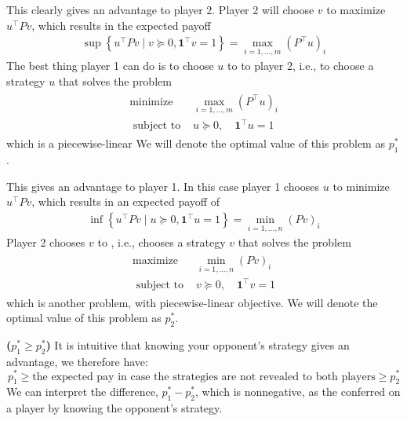 \documentclass{article}
\newcommand{\bfs}[1]{\textbf{({#1}) }}
\begin{document}

This clearly gives an advantage to player 2. Player 2 will choose $v$ to maximize $u^{\top} P v$, which results in the expected payoff
\begin{align*}
\sup \left\{u^{\top} P v \mid v \succeq 0, \mathbf{1}^{\top} v=1\right\}=\max _{i=1, \ldots, m}\left(P^{\top} u\right)_{i}
\end{align*}
The best thing player 1 can do is to choose $u$ to  to player 2, i.e., to choose a strategy $u$ that solves the problem
\begin{align}
\begin{array}{ll}
\operatorname{minimize} & \max _{i=1, \ldots, m}\left(P^{\top} u\right)_{i} \\
\text { subject to } & u \succeq 0, \quad \mathbf{1}^{\top} u=1
\end{array}\label{eq:fhegh}
\end{align}
which is a piecewise-linear  We will denote the optimal value of this problem as $p_{1}^* $. 


This  gives an advantage to player 1. In this case player 1 chooses $u$ to minimize $u^{\top} P v$, which results in an expected payoff of
\begin{align*}
\inf \left\{u^{\top} P v \mid u \succeq 0, \mathbf{1}^{\top} u=1\right\}=\min _{i=1, \ldots, n}(P v)_{i}
\end{align*}
Player 2 chooses $v$ to , i.e., chooses a strategy $v$ that solves the problem
\begin{align}
\begin{array}{ll}
\operatorname{maximize} & \min _{i=1, \ldots, n}(P v)_{i} \\
\text { subject to } & v \succeq 0, \quad \mathbf{1}^{\top} v=1
\end{array}\label{eq:fhegh1}
\end{align}
which is another  problem, with piecewise-linear  objective. We will denote the optimal value of this problem as $p_{2}^* $. 
\begin{rema}\bfs{$p_{1}^*  \geq p_{2}^* $}\label{rem:bgtaew}
It is intuitive that knowing your opponent's strategy gives an advantage, we therefore have: $$p_{1}^* \ge \text{the expected pay in case the strategies are not revealed to both players}\ge p_{2}^* $$
We can interpret the difference, $p_{1}^* -p_{2}^* $, which is nonnegative, as the  conferred on a player by knowing the opponent's strategy.
\end{rema}
\end{document}
